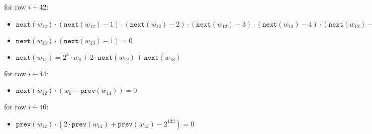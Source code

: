 for row $i+42$:
\begin{itemize}
    \item $\texttt{next}(w_{12}) \cdot (\texttt{next}(w_{12}) - 1) \cdot (\texttt{next}(w_{12}) - 2) \cdot (\texttt{next}(w_{12}) - 3) \cdot (\texttt{next}(w_{12}) - 4) \cdot (\texttt{next}(w_{12}) - 5) \cdot (\texttt{next}(w_{12}) - 6) \cdot (\texttt{next}(w_{12}) - 7)= 0$
    \item $\texttt{next}(w_{13}) \cdot (\texttt{next}(w_{13}) - 1) = 0$
    \item $\texttt{next}(w_{14}) = 2^4\cdot w_6 + 2 \cdot \texttt{next}(w_{12}) + \texttt{next}(w_{13})$
\end{itemize}

for row $i+44$:
\begin{itemize}
    \item $\texttt{next}(w_{12}) \cdot (w_6-\texttt{prev}(w_{14})) = 0$
\end{itemize}

for row $i+46$:
\begin{itemize}
    \item $\texttt{prev}(w_{12}) \cdot (2\cdot \texttt{prev}(w_{14}) + \texttt{prev}(w_{13}) -2^{123}) = 0$
\end{itemize}


